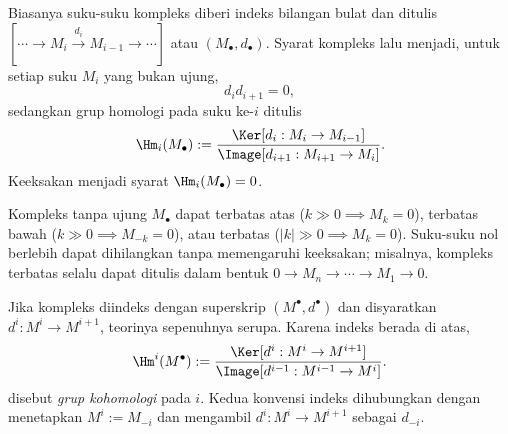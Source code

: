Biasanya suku-suku kompleks diberi indeks bilangan bulat dan ditulis $[ \cdots \to  M_i \xrightarrow{d_i} M_{i-1} \to \cdots]$ atau $(M_\bullet, d_\bullet)$. Syarat kompleks lalu menjadi, untuk setiap suku $M_i$ yang bukan ujung,
\[ d_i d_{i+1} = 0, \]
sedangkan grup homologi pada suku ke-$i$ ditulis
\[ \Hm_i(M_\bullet) := \frac{\Ker[d_i: M_i \to M_{i-1}]}{\Image[d_{i+1}: M_{i+1} \to M_i ]}. \]
Keeksakan menjadi syarat $\Hm_i(M_\bullet) = 0$.

Kompleks tanpa ujung $M_\bullet$ dapat terbatas atas ($k \gg 0 \implies M_k = 0$), terbatas bawah ($k \gg 0 \implies M_{-k}=0$), atau terbatas ($|k| \gg 0 \implies M_k = 0$). Suku-suku nol berlebih dapat dihilangkan tanpa memengaruhi keeksakan; misalnya, kompleks terbatas selalu dapat ditulis dalam bentuk $0 \to M_n \to \cdots \to M_1 \to 0$.

Jika kompleks diindeks dengan superskrip $(M^\bullet, d^\bullet)$ dan disyaratkan $d^i: M^i \to M^{i+1}$, teorinya sepenuhnya serupa. Karena indeks berada di atas, 
\[ \Hm^i(M^\bullet) := \frac{\Ker[d^i: M^i \to M^{i+1}]}{\Image[d^{i-1}: M^{i-1} \to M^i]}. \]
disebut \emph{grup kohomologi} pada $i$. Kedua konvensi indeks dihubungkan dengan menetapkan $M^i := M_{-i}$ dan mengambil $d^i: M^i \to M^{i+1}$ sebagai $d_{-i}$. 

